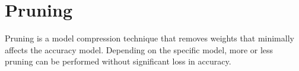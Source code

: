 \section{Pruning}
Pruning is a model compression technique that removes weights that minimally affects the accuracy model.
Depending on the specific model, more or less pruning can be performed without significant loss in accuracy.
